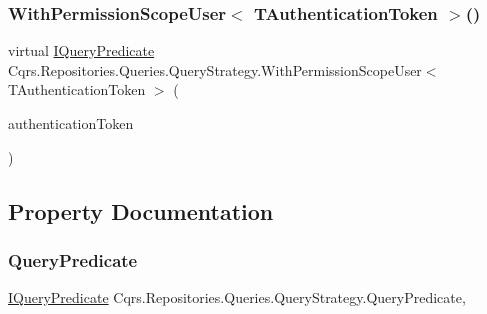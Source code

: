 \subsubsection{\texorpdfstring{With\+Permission\+Scope\+User$<$ T\+Authentication\+Token $>$()}{WithPermissionScopeUser< TAuthenticationToken >()}}
{\footnotesize\ttfamily virtual \hyperlink{interfaceCqrs_1_1Repositories_1_1Queries_1_1IQueryPredicate}{I\+Query\+Predicate} Cqrs.\+Repositories.\+Queries.\+Query\+Strategy.\+With\+Permission\+Scope\+User$<$ T\+Authentication\+Token $>$ (\begin{DoxyParamCaption}\item[{T\+Authentication\+Token}]{authentication\+Token }\end{DoxyParamCaption})\hspace{0.3cm}{\ttfamily [virtual]}}



\subsection{Property Documentation}
\mbox{\label{classCqrs_1_1Repositories_1_1Queries_1_1QueryStrategy_a45d9ad6895a7e8c404ea64abab5242ec}} 
\subsubsection{\texorpdfstring{Query\+Predicate}{QueryPredicate}}
{\footnotesize\ttfamily \hyperlink{interfaceCqrs_1_1Repositories_1_1Queries_1_1IQueryPredicate}{I\+Query\+Predicate} Cqrs.\+Repositories.\+Queries.\+Query\+Strategy.\+Query\+Predicate\hspace{0.3cm}{\ttfamily [get]}, {}}

